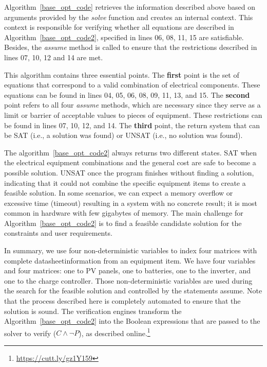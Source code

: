 \documentclass[10pt,journal,compsoc]{IEEEtran}
\begin{document}
Algorithm~\ref{base_opt_code} retrieves the information described above based on arguments provided by the \textit{solve} function and creates an internal context. This context is responsible for verifying whether all equations are described in Algorithm~\ref{base_opt_code2}, specified in lines 06, 08, 11, 15 are satisfiable. Besides, the \textit{assume} method is called to ensure that the restrictions described in lines 07, 10, 12 and 14 are met.

This algorithm contains three essential points. The \textbf{first} point is the set of equations that correspond to a valid combination of electrical components. These equations can be found in lines 04, 05, 06, 08, 09, 11, 13, and 15. The \textbf{second} point refers to all four \textit{assume} methods, which are necessary since they serve as a limit or barrier of acceptable values to pieces of equipment. These restrictions can be found in lines 07, 10, 12, and 14. The \textbf{third} point, the return system that can be SAT (i.e., a solution was found) or UNSAT (i.e., no solution was found).

The algorithm~\ref{base_opt_code2} always returns two different states. SAT when the electrical equipment combinations and the general cost are safe to become a possible solution.  UNSAT once the program finishes without finding a solution, indicating that it could not combine the specific equipment items to create a feasible solution. In some scenarios, we can expect a memory overflow or excessive time (timeout) resulting in a system with no concrete result; it is most common in hardware with few gigabytes of memory. The main challenge for Algorithm~\ref{base_opt_code2} is to find a feasible candidate solution for the constraints and user requirements.

In summary, we use four non-deterministic variables to index four matrices with complete datasheet\footnotemark[\value{footnote}] information from an equipment item. We have four variables and four matrices: one to PV panels, one to batteries, one to the inverter, and one to the charge controller. Those non-deterministic variables are used during the search for the feasible solution and controlled by the statements assume. Note that the process described here is completely automated to ensure that the solution is sound. The verification engines transform the Algorithm~\ref{base_opt_code2} into the Boolean expressions that are passed to the solver to verify ($C \wedge \neg P$), as described online.\footnote{\href{https://cutt.ly/gz1Y159}{https://cutt.ly/gz1Y159}}
\end{document}
